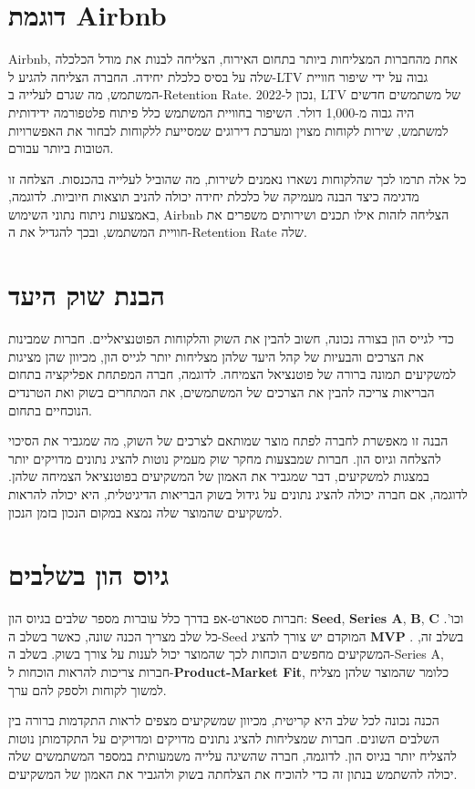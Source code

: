 \section{דוגמת Airbnb}
Airbnb, אחת מהחברות המצליחות ביותר בתחום האירוח, הצליחה לבנות את מודל הכלכלה שלה על בסיס כלכלת יחידה. החברה הצליחה להגיע ל-LTV גבוה על ידי שיפור חוויית המשתמש, מה שגרם לעלייה ב-Retention Rate. נכון ל-2022, LTV של משתמשים חדשים היה גבוה מ-1,000 דולר. השיפור בחוויית המשתמש כלל פיתוח פלטפורמה ידידותית למשתמש, שירות לקוחות מצוין ומערכת דירוגים שמסייעת ללקוחות לבחור את האפשרויות הטובות ביותר עבורם.

כל אלה תרמו לכך שהלקוחות נשארו נאמנים לשירות, מה שהוביל לעלייה בהכנסות. הצלחה זו מדגימה כיצד הבנה מעמיקה של כלכלת יחידה יכולה להניב תוצאות חיוביות. לדוגמה, באמצעות ניתוח נתוני השימוש, Airbnb הצליחה לזהות אילו תכנים ושירותים משפרים את חוויית המשתמש, ובכך להגדיל את ה-Retention Rate שלה.

\section{הבנת שוק היעד}
כדי לגייס הון בצורה נכונה, חשוב להבין את השוק והלקוחות הפוטנציאליים. חברות שמבינות את הצרכים והבעיות של קהל היעד שלהן מצליחות יותר לגייס הון, מכיוון שהן מציגות למשקיעים תמונה ברורה של פוטנציאל הצמיחה. לדוגמה, חברה המפתחת אפליקציה בתחום הבריאות צריכה להבין את הצרכים של המשתמשים, את המתחרים בשוק ואת הטרנדים הנוכחיים בתחום.

הבנה זו מאפשרת לחברה לפתח מוצר שמותאם לצרכים של השוק, מה שמגביר את הסיכוי להצלחה וגיוס הון. חברות שמבצעות מחקר שוק מעמיק נוטות להציג נתונים מדויקים יותר במצגות למשקיעים, דבר שמגביר את האמון של המשקיעים בפוטנציאל הצמיחה שלהן. לדוגמה, אם חברה יכולה להציג נתונים על גידול בשוק הבריאות הדיגיטלית, היא יכולה להראות למשקיעים שהמוצר שלה נמצא במקום הנכון בזמן הנכון.

\section{גיוס הון בשלבים}
חברות סטארט-אפ בדרך כלל עוברות מספר שלבים בגיוס הון: \textbf{Seed}, \textbf{Series A}, \textbf{B}, \textbf{C} וכו'. כל שלב מצריך הכנה שונה, כאשר בשלב ה-Seed המוקדם יש צורך להציג \textbf{MVP }. בשלב זה, המשקיעים מחפשים הוכחות לכך שהמוצר יכול לענות על צורך בשוק. בשלב ה-Series A, חברות צריכות להראות הוכחות ל-\textbf{Product-Market Fit}, כלומר שהמוצר שלהן מצליח למשוך לקוחות ולספק להם ערך.

הכנה נכונה לכל שלב היא קריטית, מכיוון שמשקיעים מצפים לראות התקדמות ברורה בין השלבים השונים. חברות שמצליחות להציג נתונים מדויקים ומדויקים על התקדמותן נוטות להצליח יותר בגיוס הון. לדוגמה, חברה שהשיגה עלייה משמעותית במספר המשתמשים שלה יכולה להשתמש בנתון זה כדי להוכיח את הצלחתה בשוק ולהגביר את האמון של המשקיעים.


